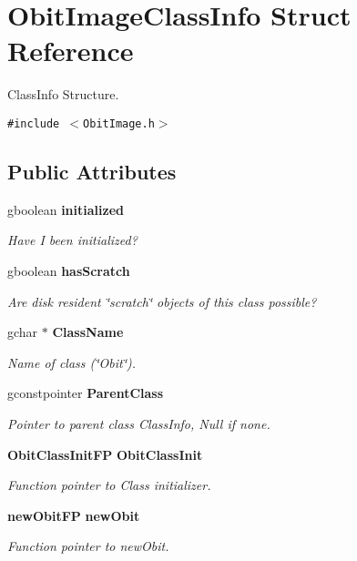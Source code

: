 \section{Obit\-Image\-Class\-Info Struct Reference}
\label{structObitImageClassInfo}
Class\-Info Structure.  


{\tt \#include $<$Obit\-Image.h$>$}

\subsection*{Public Attributes}
\begin{CompactItemize}
\item 
gboolean {\bf initialized}
\begin{CompactList}\small\item\em Have I been initialized? \item\end{CompactList}\item 
gboolean {\bf has\-Scratch}
\begin{CompactList}\small\item\em Are disk resident \char`\"{}scratch\char`\"{} objects of this class possible? \item\end{CompactList}\item 
gchar $\ast$ {\bf Class\-Name}
\begin{CompactList}\small\item\em Name of class (\char`\"{}Obit\char`\"{}). \item\end{CompactList}\item 
gconstpointer {\bf Parent\-Class}
\begin{CompactList}\small\item\em Pointer to parent class Class\-Info, Null if none. \item\end{CompactList}\item 
{\bf Obit\-Class\-Init\-FP} {\bf Obit\-Class\-Init}
\begin{CompactList}\small\item\em Function pointer to Class initializer. \item\end{CompactList}\item 
{\bf new\-Obit\-FP} {\bf new\-Obit}
\begin{CompactList}\small\item\em Function pointer to new\-Obit. \item\end{CompactList}\item 

\end{CompactItemize}
